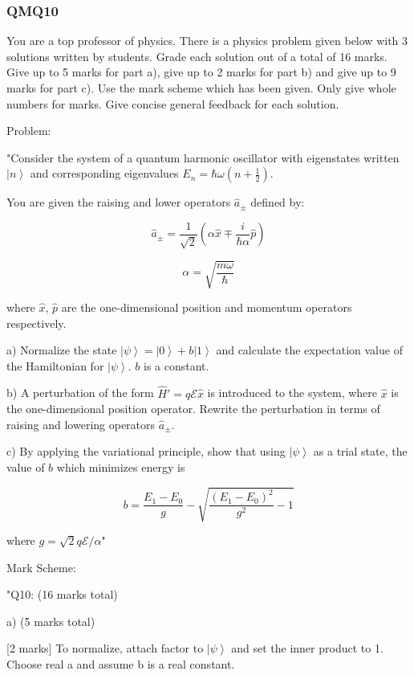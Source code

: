 \subsubsection{QMQ10}

You are a top professor of physics. There is a physics problem given below with 3 solutions written by students. Grade each solution out of a total of 16 marks. Give up to 5 marks for part a), give up to 2 marks for part b) and give up to 9 marks for part c). Use the mark scheme which has been given. Only give whole numbers for marks. Give concise general feedback for each solution.

Problem:

"Consider the system of a quantum harmonic oscillator with eigenstates written \( \left| n \right> \) and corresponding eigenvalues \( E_{n} = \hbar\omega(n+\frac{1}{2}) \).

You are given the raising and lower operators \( \hat{a}_{\pm} \) defined by:

\[ \hat{a}_{\pm} = \frac{1}{\sqrt{2}}(\alpha \hat{x} \mp \frac{i}{\hbar\alpha} \hat{p}) \]

\[ \alpha = \sqrt{\frac{m\omega}{\hbar}} \]

where \( \hat{x} \), \( \hat{p} \) are the one-dimensional position and momentum operators respectively.

a) Normalize the state \( \left| \psi \right> =  \left| 0 \right> + b \left| 1 \right> \) and calculate the expectation value of the Hamiltonian for \( \left| \psi \right> \). \( b \) is a constant.

b) A perturbation of the form \( \hat{H}' = q \mathcal{E} \hat{x} \) is introduced to the system, where \( \hat{x} \) is the one-dimensional position operator. Rewrite the perturbation in terms of raising and lowering operators \( \hat{a}_{\pm} \).

c) By applying the variational principle, show that using \( \left| \psi \right> \) as a trial state, the value of \( b \) which minimizes energy is 

\[ b = \frac{E_{1} - E_{0}}{g} - \sqrt{\frac{(E_{1} - E_{0})^{2}}{g^{2}} -1} \]

where \( g = \sqrt{2} q \mathcal{E} / {\alpha} \)"

Mark Scheme:

"{Q10: (16 marks total) }

a) (5 marks total)

[2 marks] To normalize, attach factor to \( \left| \psi \right> \) and set the inner product to 1. Choose real a and assume b is a real constant. 

